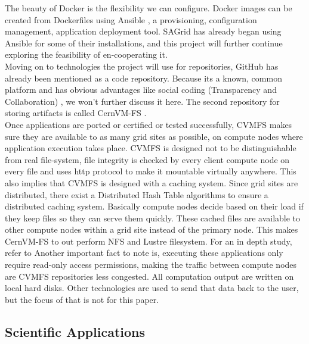 \documentclass [titlepage,11pt]{article}
\begin{document}
The beauty of Docker is the flexibility we can configure. Docker images can be created from Dockerfiles using Ansible \citep{ansible}, a provisioning, configuration management, application deployment tool. SAGrid has already began using Ansible for some of their installations, and this project will further continue exploring the feasibility of en-cooperating it. \\

Moving on to technologies the project will use for repositories, GitHub has already been mentioned as a code repository. Because its a known, common platform and has obvious advantages like social coding (Transparency and Collaboration) \citep{dabbish12}, we won't further discuss it here. The second repository for storing artifacts is called CernVM-FS \citep{cvmfs}. \\

Once applications are ported or certified or tested successfully, CVMFS makes sure they are available to as many grid sites as possible, on compute nodes where application execution takes place. CVMFS is designed not to be distinguishable from real file-system, file integrity is checked by every client compute node on every file and uses http protocol to make it mountable virtually anywhere. This also implies that CVMFS is designed with a caching system. Since grid sites are distributed, there exist a Distributed Hash Table algorithms to ensure a distributed caching system. Basically compute nodes decide based on their load if they keep files so they can serve them quickly. These cached files are available to other compute nodes within a grid site instead of the primary node. This makes CernVM-FS to out perform NFS and Lustre filesystem. For an in depth study, refer to \citep{blomer12} Another important fact to note is, executing these applications only require read-only access permissions, making the traffic between compute nodes are CVMFS repositories less congested. All computation output are written on local hard disks. Other technologies are used to send that data back to the user, but the focus of that is not for this paper. 


\subsection{Scientific Applications}
\end{document}
